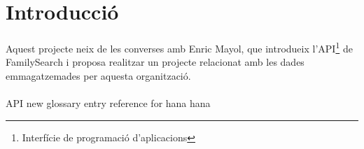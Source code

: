 \section{Introducció}
\paragraph{}
Aquest projecte neix de les converses amb Enric Mayol, que introdueix l'API\footnote{\label{foot-api}Interfície de programació d'aplicacions} de FamilySearch i proposa realitzar un projecte relacionat amb les dades emmagatzemades per aquesta organització.

\paragraph{}
\gls{API}
new glossary entry reference for hana \gls{hana}
